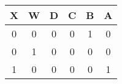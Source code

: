 \begin{center}
\begin{tabular}{|c|c||c|c|c|c|}
\hline
X & W & D & C & B & A\\
\hline
0 & 0 & 0 & 0 & 1 & 0\\
0 & 1 & 0 & 0 & 0 & 0\\
1 & 0 & 0 & 0 & 0 & 1\\
\hline
\end{tabular}
\end{center}
